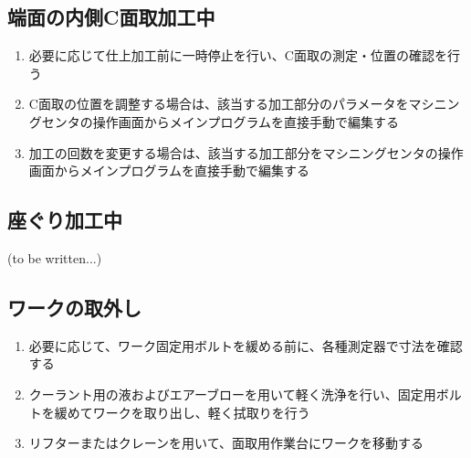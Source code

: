 \subsection{端面の内側C面取加工中}
\begin{enumerate}
\item 必要に応じて仕上加工前に一時停止を行い、C面取の測定・位置の確認を行う
\item C面取の位置を調整する場合は、該当する加工部分のパラメータをマシニングセンタの操作画面からメインプログラムを直接手動で編集する
\item {}加工の回数を変更する場合は、該当する加工部分をマシニングセンタの操作画面からメインプログラムを直接手動で編集する
\end{enumerate}


\subsection{座ぐり加工中\TBW}
(to be written...)



\clearpage


\subsection{ワークの取外し}
\begin{enumerate}
\item 必要に応じて、ワーク固定用ボルトを緩める前に、各種測定器で寸法を確認する
\item クーラント用の液およびエアーブローを用いて軽く洗浄を行い、固定用ボルトを緩めてワークを取り出し、軽く拭取りを行う
\item {}リフターまたはクレーンを用いて、面取用作業台にワークを移動する
\end{enumerate}


